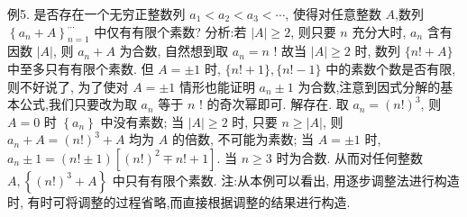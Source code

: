 例5. 是否存在一个无穷正整数列 $a_1<a_2<a_3<\cdots$, 使得对任意整数 $A$,数列 $\left\{a_n+A\right\}_{n=1}^{\cdots}$ 中仅有有限个素数?
分析:若 $|A| \geqslant 2$, 则只要 $n$ 充分大时, $a_n$ 含有因数 $|A|$, 则 $a_n+A$ 为合数, 自然想到取 $a_n=n$ ! 故当 $|A| \geqslant 2$ 时, 数列 $\{n !+A\}$ 中至多只有有限个素数.
但 $A= \pm 1$ 时, $\{n !+1\},\{n !-1\}$ 中的素数个数是否有限, 则不好说了, 为了使对 $A= \pm 1$ 情形也能证明 $a_n \pm 1$ 为合数,注意到因式分解的基本公式,我们只要改为取 $a_n$ 等于 $n$ ! 的奇次幂即可.
解存在.
取 $a_n=(n !)^3$, 则 $A=0$ 时 $\left\{a_n\right\}$ 中没有素数; 当 $|A| \geqslant 2$ 时, 只要 $n \geqslant|A|$, 则 $a_n+A=(n !)^3+A$ 均为 $A$ 的倍数, 不可能为素数; 当 $A= \pm 1$ 时, $a_n \pm 1=(n ! \pm 1)\left[(n !)^2 \mp n !+1\right]$. 当 $n \geqslant 3$ 时为合数.
从而对任何整数 $A,\left\{(n !)^3+A\right\}$ 中只有有限个素数.
注:从本例可以看出, 用逐步调整法进行构造时, 有时可将调整的过程省略,而直接根据调整的结果进行构造.



